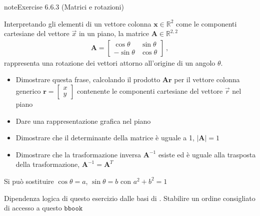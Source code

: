 \documentclass[letterpaper,10pt,italian]{jupyterBook}
\begin{document}
\begin{sphinxadmonition}{note}{Exercise 6.6.3 (Matrici e rotazioni)}



\sphinxAtStartPar
Interpretando gli elementi di un vettore colonna \(\mathbf{x} \in \mathbb{R}^2\) come le componenti cartesiane del vettore \(\vec{x}\) in un piano, la matrice \(\mathbf{A} \in \mathbb{R}^{2,2}\)
\begin{equation*}
\begin{split}\mathbf{A} = \begin{bmatrix} \cos\theta & \sin \theta \\ -\sin\theta & \cos\theta \end{bmatrix} \ ,\end{split}
\end{equation*}
\sphinxAtStartPar
rappresenta una rotazione dei vettori attorno all’origine di un angolo \(\theta\).


\begin{itemize}
\item {} 
\sphinxAtStartPar
Dimostrare questa frase, calcolando il prodotto \(\mathbf{A} \mathbf{r}\) per il vettore colonna generico \(\mathbf{r} = \begin{bmatrix} x \\ y \end{bmatrix}\) contenente le componenti cartesiane del vettore \(\vec{r}\) nel piano

\item {} 
\sphinxAtStartPar
Dare una rappresentazione grafica nel piano

\item {} 
\sphinxAtStartPar
Dimostrare che il determinante della matrice è uguale a 1, \(|\mathbf{A}| = 1\)

\item {} 
\sphinxAtStartPar
Dimostrare che la trasformazione inversa \(\mathbf{A}^{-1}\) esiste ed è uguale alla trasposta della trasformazione, \(\mathbf{A}^{-1} = \mathbf{A}^T\)

\end{itemize}

\sphinxAtStartPar
{} Si può sostituire \(\cos \theta = a\), \(\sin \theta = b\) con \(a^2 + b^2 = 1\)

\sphinxAtStartPar
{} Dipendenza logica di questo esercizio dalle basi di {\hyperref[\detokenize{ch/trigonometry:math-hs-trigonometry}]{}}. Stabilire un ordine consigliato di accesso a questo \(\texttt{bbook}\)
\end{sphinxadmonition}
 \label{exercise:matrix-projection-parallel}
\end{document}
